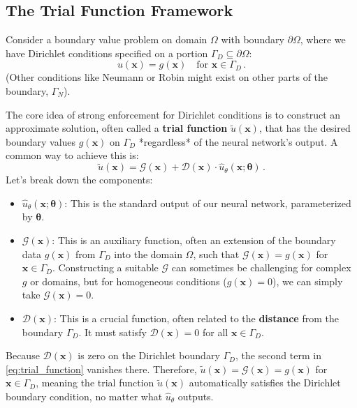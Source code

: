 \subsection{The Trial Function Framework}
\label{subsec:strong_framework}

Consider a boundary value problem on domain $\Omega$ with boundary $\partial\Omega$, where we have Dirichlet conditions specified on a portion $\Gamma_D \subseteq \partial\Omega$:
%
\begin{equation*}
u(\mathbf{x}) = g(\mathbf{x}) \quad \text{for } \mathbf{x} \in \Gamma_D\,.
\end{equation*}
%
(Other conditions like Neumann or Robin might exist on other parts of the boundary, $\Gamma_N$).

The core idea of strong enforcement for Dirichlet conditions is to construct an approximate solution, often called a \textbf{trial function} $\tilde{u}(\mathbf{x})$, that has the desired boundary values $g(\mathbf{x})$ on $\Gamma_D$ *regardless* of the neural network's output. A common way to achieve this is:
%
\begin{equation}
\tilde{u}(\mathbf{x}) = \mathcal{G}(\mathbf{x}) + \mathcal{D}(\mathbf{x}) \cdot \hat{u}_\theta(\mathbf{x}; \boldsymbol{\theta})\,.
\label{eq:trial_function}
\end{equation}
%
Let's break down the components:
\begin{itemize}
    \item $\hat{u}_\theta(\mathbf{x}; \boldsymbol{\theta})$: This is the standard output of our neural network, parameterized by $\boldsymbol{\theta}$.
    \item $\mathcal{G}(\mathbf{x})$: This is an auxiliary function, often an extension of the boundary data $g(\mathbf{x})$ from $\Gamma_D$ into the domain $\Omega$, such that $\mathcal{G}(\mathbf{x}) = g(\mathbf{x})$ for $\mathbf{x} \in \Gamma_D$. Constructing a suitable $\mathcal{G}$ can sometimes be challenging for complex $g$ or domains, but for homogeneous conditions ($g(\mathbf{x})=0$), we can simply take $\mathcal{G}(\mathbf{x})=0$.
    \item $\mathcal{D}(\mathbf{x})$: This is a crucial function, often related to the \textbf{distance} from the boundary $\Gamma_D$. It must satisfy $\mathcal{D}(\mathbf{x}) = 0$ for all $\mathbf{x} \in \Gamma_D$.
\end{itemize}
Because $\mathcal{D}(\mathbf{x})$ is zero on the Dirichlet boundary $\Gamma_D$, the second term in \cref{eq:trial_function} vanishes there. Therefore, $\tilde{u}(\mathbf{x}) = \mathcal{G}(\mathbf{x}) = g(\mathbf{x})$ for $\mathbf{x} \in \Gamma_D$, meaning the trial function $\tilde{u}(\mathbf{x})$ automatically satisfies the Dirichlet boundary condition, no matter what $\hat{u}_\theta$ outputs.


